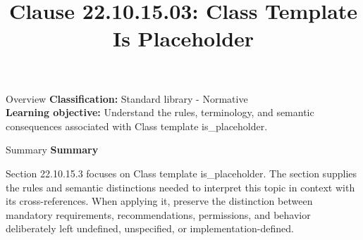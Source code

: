 \documentclass[10pt,letterpaper]{article}
\title{Clause 22.10.15.03: Class Template Is Placeholder}
\author{}
\date{}
\begin{document}
\maketitle
\begin{CornellOverviewBox}{Overview}
\textbf{Classification:} Standard library - Normative\\[2pt]
\textbf{Learning objective:} Understand the rules, terminology, and semantic consequences associated with Class template is\_placeholder.
\end{CornellOverviewBox}\begin{CornellSummaryBox}{Summary}
{\sffamily\bfseries\color{Accent} Summary}\par\vspace{3pt}Section 22.10.15.3 focuses on Class template is\_placeholder. The section supplies the rules and semantic distinctions needed to interpret this topic in context with its cross-references. When applying it, preserve the distinction between mandatory requirements, recommendations, permissions, and behavior deliberately left undefined, unspecified, or implementation-defined.
\end{CornellSummaryBox}
\end{document}
